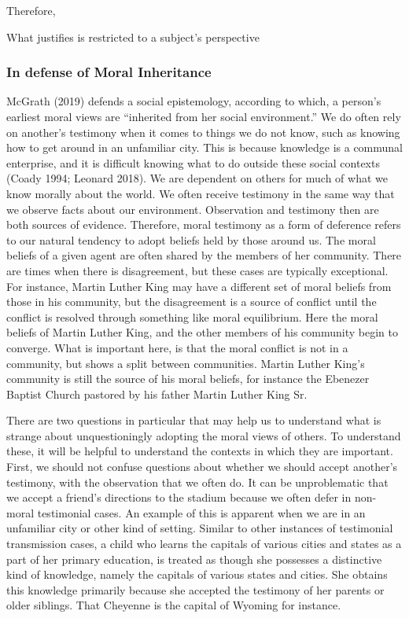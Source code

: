\documentclass[
  letterpaper,
  DIV=11,
  numbers=noendperiod]{scrartcl}
\theoremstyle{remark}
\begin{document}
Therefore,

What justifies is restricted to a subject's perspective

\subsubsection{In defense of Moral
Inheritance}\label{in-defense-of-moral-inheritance}

McGrath (2019) defends a social epistemology, according to which, a
person's earliest moral views are ``inherited from her social
environment.'' We do often rely on another's testimony when it comes to
things we do not know, such as knowing how to get around in an
unfamiliar city. This is because knowledge is a communal enterprise, and
it is difficult knowing what to do outside these social contexts (Coady
1994; Leonard 2018). We are dependent on others for much of what we know
morally about the world. We often receive testimony in the same way that
we observe facts about our environment. Observation and testimony then
are both sources of evidence. Therefore, moral testimony as a form of
deference refers to our natural tendency to adopt beliefs held by those
around us. The moral beliefs of a given agent are often shared by the
members of her community. There are times when there is disagreement,
but these cases are typically exceptional. For instance, Martin Luther
King may have a different set of moral beliefs from those in his
community, but the disagreement is a source of conflict until the
conflict is resolved through something like moral equilibrium. Here the
moral beliefs of Martin Luther King, and the other members of his
community begin to converge. What is important here, is that the moral
conflict is not in a community, but shows a split between communities.
Martin Luther King's community is still the source of his moral beliefs,
for instance the Ebenezer Baptist Church pastored by his father Martin
Luther King Sr.

There are two questions in particular that may help us to understand
what is strange about unquestioningly adopting the moral views of
others. To understand these, it will be helpful to understand the
contexts in which they are important. First, we should not confuse
questions about whether we should accept another's testimony, with the
observation that we often do. It can be unproblematic that we accept a
friend's directions to the stadium because we often defer in non-moral
testimonial cases. An example of this is apparent when we are in an
unfamiliar city or other kind of setting. Similar to other instances of
testimonial transmission cases, a child who learns the capitals of
various cities and states as a part of her primary education, is treated
as though she possesses a distinctive kind of knowledge, namely the
capitals of various states and cities. She obtains this knowledge
primarily because she accepted the testimony of her parents or older
siblings. That Cheyenne is the capital of Wyoming for instance.
\end{document}
